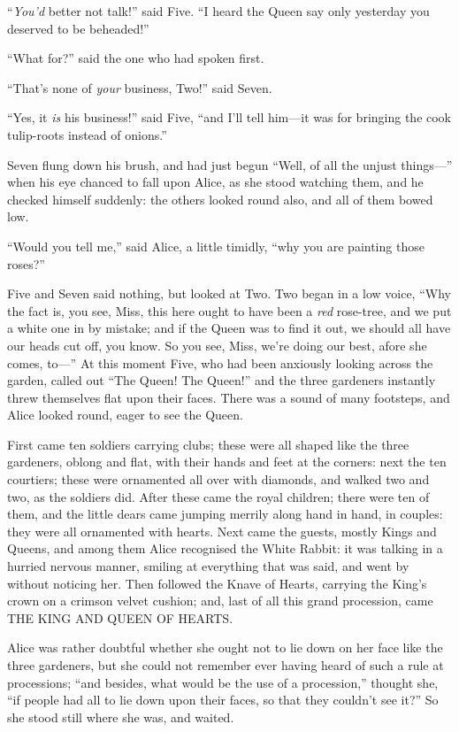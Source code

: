 \documentclass[11pt,openany,oneside]{book}
\begin{document}
“{\em You’d\/} better not talk!” said Five. “I heard the Queen say only yesterday you deserved to be beheaded!” 

“What for?” said the one who had spoken first. 

“That’s none of {\em your\/} business, Two!” said Seven. 

“Yes, it {\em is\/} his business!” said Five, “and I’ll tell him—it was for bringing the cook tulip-roots instead of onions.” 

Seven flung down his brush, and had just begun “Well, of all the unjust things—” when his eye chanced to fall upon Alice, as she stood watching them, and he checked himself suddenly: the others looked round also, and all of them bowed low. 

“Would you tell me,” said Alice, a little timidly, “why you are painting those roses?” 

Five and Seven said nothing, but looked at Two. Two began in a low voice, “Why the fact is, you see, Miss, this here ought to have been a {\em red\/} rose-tree, and we put a white one in by mistake; and if the Queen was to find it out, we should all have our heads cut off, you know. So you see, Miss, we’re doing our best, afore she comes, to—” At this moment Five, who had been anxiously looking across the garden, called out “The Queen! The Queen!” and the three gardeners instantly threw themselves flat upon their faces. There was a sound of many footsteps, and Alice looked round, eager to see the Queen. 

First came ten soldiers carrying clubs; these were all shaped like the three gardeners, oblong and flat, with their hands and feet at the corners: next the ten courtiers; these were ornamented all over with diamonds, and walked two and two, as the soldiers did. After these came the royal children; there were ten of them, and the little dears came jumping merrily along hand in hand, in couples: they were all ornamented with hearts. Next came the guests, mostly Kings and Queens, and among them Alice recognised the White Rabbit: it was talking in a hurried nervous manner, smiling at everything that was said, and went by without noticing her. Then followed the Knave of Hearts, carrying the King’s crown on a crimson velvet cushion; and, last of all this grand procession, came THE KING AND QUEEN OF HEARTS. 

Alice was rather doubtful whether she ought not to lie down on her face like the three gardeners, but she could not remember ever having heard of such a rule at processions; “and besides, what would be the use of a procession,” thought she, “if people had all to lie down upon their faces, so that they couldn’t see it?” So she stood still where she was, and waited. 
\end{document}
